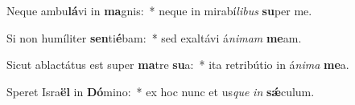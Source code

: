 \item Neque ambu\textbf{lá}vi in \textbf{ma}gnis:~* neque in mirabí\textit{li}\textit{bus} \textbf{su}per me.
\item Si non humíliter \textbf{sen}ti\textbf{é}bam:~* sed exaltávi á\textit{ni}\textit{mam} \textbf{me}am.
\item Sicut ablactátus est super \textbf{ma}tre \textbf{su}a:~* ita retribútio in á\textit{ni}\textit{ma} \textbf{me}a.
\item Speret Isra\textbf{ël} in \textbf{Dó}mino:~* ex hoc nunc et us\textit{que} \textit{in} \textbf{sǽ}culum.
